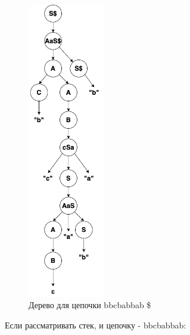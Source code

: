 \documentclass[areasetadvanced]{scrartcl}
\begin{document}
\begin{figure}[H]
    \centering
    \includegraphics[width=0.3\textwidth]{images/tree.png}
    \caption{Дерево для цепочки bbcbabbab \$}
    \label{tree}
\end{figure}

Если рассматривать стек, и цепочку - bbcbabbab:

\newcommand{\stk}[1]{\texttt{#1}}  
\end{document}
